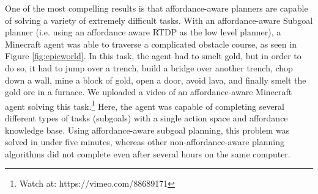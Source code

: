 \documentclass[]{article}
\begin{document}



One of the most compelling results is that affordance-aware planners are capable of solving a variety of extremely difficult tasks.
With an affordance-aware Subgoal planner (i.e. using an affordance aware RTDP as the low level planner), a Minecraft agent was able to traverse a complicated obstacle course, as seen in Figure \ref{fig:epicworld}. In this task, the agent had to smelt gold, but in order to do so, it had to jump over a trench, build a bridge over another trench, chop down a wall, mine a block of gold, open a door, avoid lava, and finally smelt the gold ore in a furnace. We uploaded a video of an affordance-aware Minecraft agent solving this task.\footnote{Watch at: https://vimeo.com/88689171} Here, the agent was capable of completing several different types of tasks (subgoals) with a single action space and affordance knowledge base. Using affordance-aware subgoal
planning, this problem was solved in under five minutes, whereas other non-affordance-aware planning algorithms did not complete even after several hours on the same computer.
\end{document}
